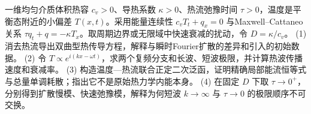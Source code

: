 一维均匀介质体积热容 \(c_v>0\)、导热系数 \(\kappa>0\)、热流弛豫时间 \(\tau>0\)，温度是平衡态附近的小偏差 \(T(x,t)\)。采用能量连续性 \(c_vT_t+q_x=0\) 与Maxwell–Cattaneo关系 \(\tau q_t+q=-\kappa T_x\)。取周期边界或无限域中快速衰减的扰动，令 \(D=\kappa/c_v\)。
(1) 消去热流导出双曲型热传导方程，解释与瞬时Fourier扩散的差异和引入的初始数据。
(2) 令 \(T\propto e^{i(kx-\omega t)}\)，求两个复频分支和长波、短波极限，并计算热波传播速度和衰减率。
(3) 构造温度—热流联合正定二次泛函，证明精确局部能流恒等式与总量单调耗散；指出它不是原始热力学内能本身。
(4) 在固定 \(D\) 下取 \(\tau\to0^+\)，分别得到扩散慢模、快速弛豫模，解释为何短波 \(k\to\infty\) 与 \(\tau\to0\) 的极限顺序不可交换。
